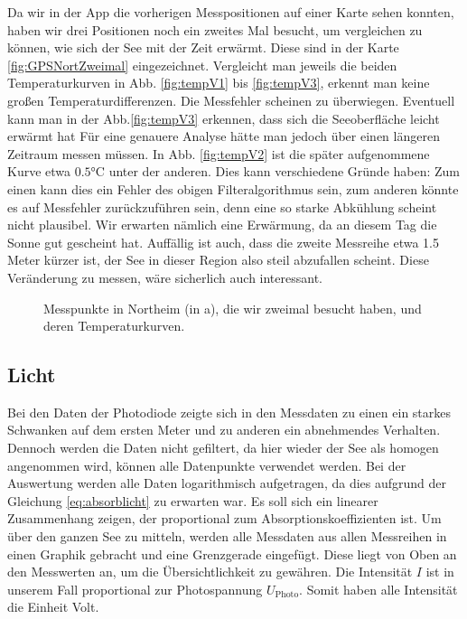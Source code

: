 \documentclass[12pt,a4paper,titlepage,headinclude,bibtotoc]{scrartcl}
\numberwithin{equation}{subsection}
\begin{document}
Da wir in der App die vorherigen Messpositionen auf einer Karte sehen konnten, haben wir drei Positionen noch ein zweites Mal besucht, um vergleichen zu können, wie sich der See mit der Zeit erwärmt.
Diese sind in der Karte \ref{fig:GPSNortZweimal} eingezeichnet.
Vergleicht man jeweils die beiden Temperaturkurven in Abb. \ref{fig:tempV1} bis \ref{fig:tempV3}, erkennt man keine großen Temperaturdifferenzen.
Die Messfehler scheinen zu überwiegen.
Eventuell kann man in der Abb.\ref{fig:tempV3} erkennen, dass sich die Seeoberfläche leicht erwärmt hat
Für eine genauere Analyse hätte man jedoch über einen längeren Zeitraum messen müssen.
In Abb. \ref{fig:tempV2} ist die später aufgenommene Kurve etwa $0.5\si\celsius$ unter der anderen.
Dies kann verschiedene Gründe haben: Zum einen kann dies ein Fehler des obigen Filteralgorithmus sein, zum anderen könnte es auf Messfehler zurückzuführen sein, denn eine so starke Abkühlung scheint nicht plausibel.
Wir erwarten nämlich eine Erwärmung, da an diesem Tag die Sonne gut gescheint hat.
Auffällig ist auch, dass die zweite Messreihe etwa 1.5 Meter kürzer ist, der See in dieser Region also steil abzufallen scheint.
Diese Veränderung zu messen, wäre sicherlich auch interessant.

\begin{figure}[!htb]
	\centering
   \hfill
   \hfill
   \hfill
	\caption{Messpunkte in Northeim (in a), die wir zweimal besucht haben, und deren Temperaturkurven.}
	\label{fig:tempNort2}
\end{figure}


\subsection{Licht}

Bei den Daten der Photodiode zeigte sich in den Messdaten zu einen ein starkes Schwanken auf dem ersten Meter und zu anderen ein abnehmendes Verhalten.
Dennoch werden die Daten nicht gefiltert, da hier wieder der See als homogen angenommen wird, können alle Datenpunkte verwendet werden.
Bei der Auswertung werden alle Daten logarithmisch aufgetragen, da dies aufgrund der Gleichung \ref{eq:absorblicht} zu erwarten war. 
Es soll sich ein linearer Zusammenhang zeigen, der proportional zum Absorptionskoeffizienten ist.
Um über den ganzen See zu mitteln, werden alle Messdaten aus allen Messreihen in einen Graphik gebracht und eine Grenzgerade eingefügt.
Diese liegt von Oben an den Messwerten an, um die Übersichtlichkeit zu gewähren.
Die Intensität $I$ ist in unserem Fall proportional zur Photospannung $U_\text{Photo}$.
Somit haben alle Intensität die Einheit Volt.
\end{document}
